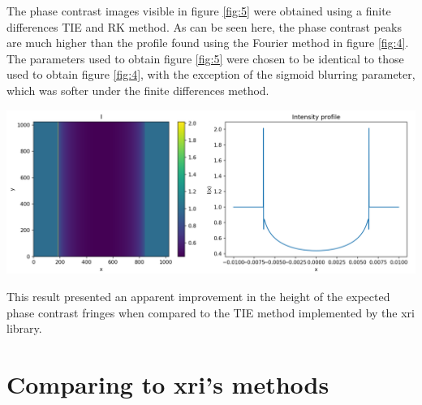 \documentclass[10pt, a4paper, singlespacing]{report}
\newenvironment{Figure}
    {\par\medskip\noindent\minipage{\linewidth}}
    {\endminipage\par\medskip}
\begin{document}
The phase contrast images visible in figure \ref{fig:5} were obtained using a finite differences TIE and RK method. As can be seen here, the phase contrast peaks are much higher than the profile found using the Fourier method in figure \ref{fig:4}. The parameters used to obtain figure \ref{fig:5} were chosen to be identical to those used to obtain figure \ref{fig:4}, with the exception of the sigmoid blurring parameter, which was softer under the finite differences method.
\begin{Figure}\label{fig:5}  
\centering
\includegraphics[width=\linewidth]{FD_intensity_profile.pdf}
\end{Figure}
This result presented an apparent improvement in the height of the expected phase contrast fringes when compared to the TIE method implemented by the xri library.

\section{Comparing to xri's methods}\label{RK}

\end{document}
